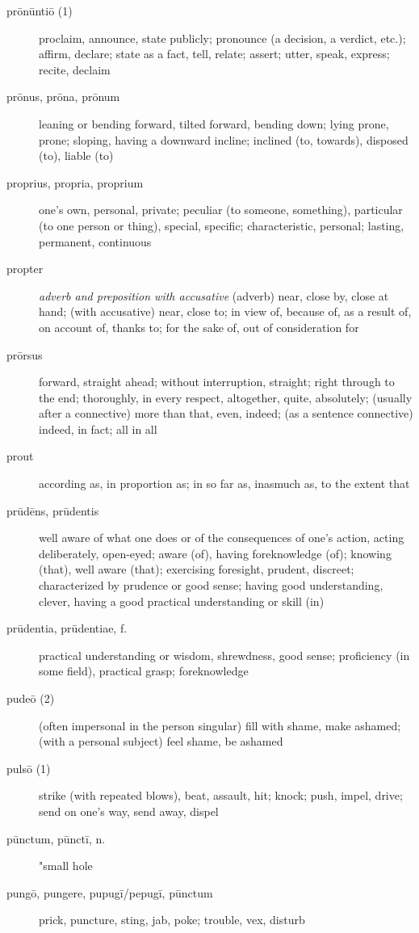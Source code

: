 \begin{description}
    \item[prōnūntiō (1)] proclaim, announce, state publicly; pronounce (a decision, a verdict, etc.); affirm, declare; state as a fact, tell, relate; assert; utter, speak, express; recite, declaim
    \item[prōnus, prōna, prōnum] leaning or bending forward, tilted forward, bending down; lying prone, prone; sloping, having a downward incline; inclined (to, towards), disposed (to), liable (to)
    \item[proprius, propria, proprium] one's own, personal, private; peculiar (to someone, something), particular (to one person or thing), special, specific; characteristic, personal; lasting, permanent, continuous
    \item[propter] \textit{adverb and preposition with accusative} (adverb) near, close by, close at hand; (with accusative) near, close to; in view of, because of, as a result of, on account of, thanks to; for the sake of, out of consideration for
    \item[prōrsus] forward, straight ahead; without interruption, straight; right through to the end; thoroughly, in every respect, altogether, quite, absolutely; (usually after a connective) more than that, even, indeed; (as a sentence connective) indeed, in fact; all in all
    \item[prout] according as, in proportion as; in so far as, inasmuch as, to the extent that
    \item[prūdēns, prūdentis] well aware of what one does or of the consequences of one's action, acting deliberately, open-eyed; aware (of), having foreknowledge (of); knowing (that), well aware (that); exercising foresight, prudent, discreet; characterized by prudence or good sense; having good understanding, clever, having a good practical understanding or skill (in)
    \item[prūdentia, prūdentiae, f.] practical understanding or wisdom, shrewdness, good sense; proficiency (in some field), practical grasp; foreknowledge
    \item[pudeō (2)] (often impersonal in the  person singular) fill with shame, make ashamed; (with a personal subject) feel shame, be ashamed
    \item[pulsō (1)] strike (with repeated blows), beat, assault, hit; knock; push, impel, drive; send on one's way, send away, dispel
    \item[pūnctum, pūnctī, n.]  "small hole
    \item[pungō, pungere, pupugī/pepugī, pūnctum] prick, puncture, sting, jab, poke; trouble, vex, disturb

\end{description}
